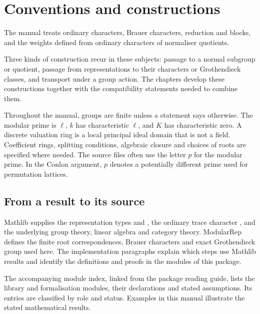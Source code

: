 \chapter{Conventions and constructions}
\label{chap:library}

The manual treats ordinary characters, Brauer characters, reduction and
blocks, and the weights defined from ordinary characters of normaliser
quotients.

Three kinds of construction recur in these subjects: passage to a normal
subgroup or quotient, passage from representations to their characters or
Grothendieck classes, and transport under a group action. The chapters
develop these constructions together with the compatibility statements
needed to combine them.

Throughout the manual, groups are finite unless a statement says otherwise.
The modular prime is $\ell$, $k$ has characteristic $\ell$, and $K$ has
characteristic zero. A discrete valuation ring is a local principal ideal
domain that is not a field. Coefficient rings, splitting conditions,
algebraic closure and choices of roots are specified where needed. The
source files often use the letter $p$ for the modular prime. In the Conlon
argument, $p$ denotes a potentially different prime used for permutation
lattices.

\section{From a result to its source}
\label{chap:library:use}

Mathlib supplies the representation types  and
, the ordinary trace character ,
and the underlying group theory, linear algebra and category theory.
ModularRep defines the finite root correspondences, Brauer characters and
exact Grothendieck group used here. The implementation paragraphs explain
which steps use Mathlib results and identify the definitions and proofs
in the modules of this package.

The accompanying module index, linked from the package reading guide,
lists the library and formalisation modules, their declarations and stated
assumptions. Its entries are classified by role and status.
Examples in this manual illustrate the stated mathematical
results.


